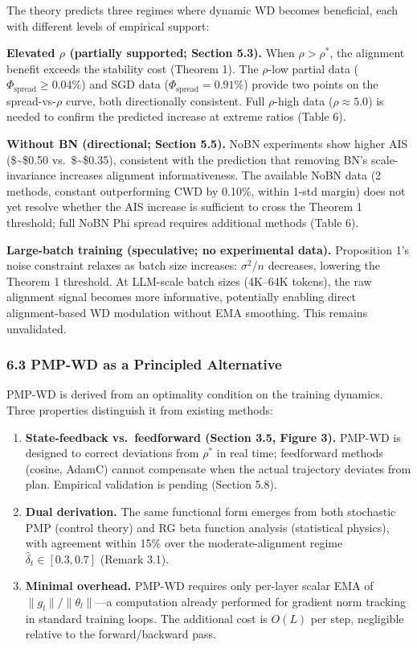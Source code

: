 \documentclass[
]{article}
\begin{document}
The theory predicts three regimes where dynamic WD becomes beneficial,
each with different levels of empirical support:

\textbf{Elevated \(\rho\) (partially supported; Section 5.3).} When
\(\rho > \rho^*\), the alignment benefit exceeds the stability cost
(Theorem 1). The \(\rho\)-low partial data
(\(\Phi_{\text{spread}} \geq 0.04\%\)) and SGD data
(\(\Phi_{\text{spread}} = 0.91\%\)) provide two points on the
spread-vs-\(\rho\) curve, both directionally consistent. Full
\(\rho\)-high data (\(\rho \approx 5.0\)) is needed to confirm the
predicted increase at extreme ratios (Table 6).

\textbf{Without BN (directional; Section 5.5).} NoBN experiments show
higher AIS (\$\sim\$0.50 vs.~\$\sim\$0.35), consistent with the
prediction that removing BN's scale-invariance increases alignment
informativeness. The available NoBN data (2 methods, constant
outperforming CWD by 0.10\%, within 1-std margin) does not yet resolve
whether the AIS increase is sufficient to cross the Theorem 1 threshold;
full NoBN Phi spread requires additional methods (Table 6).

\textbf{Large-batch training (speculative; no experimental data).}
Proposition 1's noise constraint relaxes as batch size increases:
\(\sigma^2/n\) decreases, lowering the Theorem 1 threshold. At LLM-scale
batch sizes (4K--64K tokens), the raw alignment signal becomes more
informative, potentially enabling direct alignment-based WD modulation
without EMA smoothing. This remains unvalidated.

\hypertarget{pmp-wd-as-a-principled-alternative}{%
\subsubsection{6.3 PMP-WD as a Principled
Alternative}\label{pmp-wd-as-a-principled-alternative}}

PMP-WD is derived from an optimality condition on the training dynamics.
Three properties distinguish it from existing methods:

\begin{enumerate}
\def\labelenumi{\arabic{enumi}.}
\item
  \textbf{State-feedback vs.~feedforward (Section 3.5, Figure 3).}
  PMP-WD is designed to correct deviations from \(\rho^*\) in real time;
  feedforward methods (cosine, AdamC) cannot compensate when the actual
  trajectory deviates from plan. Empirical validation is pending
  (Section 5.8).
\item
  \textbf{Dual derivation.} The same functional form emerges from both
  stochastic PMP (control theory) and RG beta function analysis
  (statistical physics), with agreement within 15\% over the
  moderate-alignment regime \(\hat{\delta}_t \in [0.3, 0.7]\) (Remark
  3.1).
\item
  \textbf{Minimal overhead.} PMP-WD requires only per-layer scalar EMA
  of \(\|g_l\| / \|\theta_l\|\)---a computation already performed for
  gradient norm tracking in standard training loops. The additional cost
  is \(O(L)\) per step, negligible relative to the forward/backward
  pass.
\end{enumerate}
\end{document}
